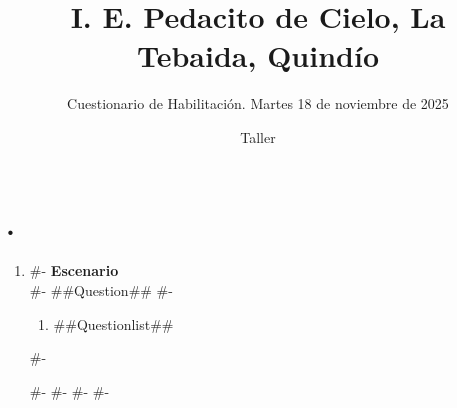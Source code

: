 \documentclass[a4paper,12pt]{article}
\title{I. E. Pedacito de Cielo, La Tebaida, Quindío}
\author{Cuestionario de Habilitación. Martes 18 de noviembre de 2025}
\date{Taller \myID}
\begin{document}
\maketitle

\section*{.}


\begin{enumerate}[label=\arabic*.]
#-
  \item
#-
  \textbf{Escenario}\\
#-
  ##Question##
#-
  \begin{enumerate}[label=(\alph*)]
    \item ##Questionlist##
  \end{enumerate}
#-

#-
#-
#-
#-
\end{enumerate}
\end{document}
